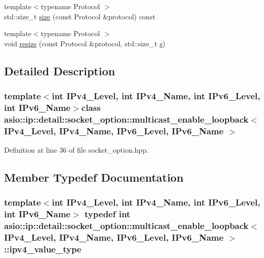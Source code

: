 \begin{DoxyCompactItemize}
\item 
{\footnotesize template$<$typename Protocol $>$ }\\std\+::size\+\_\+t \hyperlink{classasio_1_1ip_1_1detail_1_1socket__option_1_1multicast__enable__loopback_a64782a0ab8640c983d638d3ab81cc9e7}{size} (const Protocol \&protocol) const 
\item 
{\footnotesize template$<$typename Protocol $>$ }\\void \hyperlink{classasio_1_1ip_1_1detail_1_1socket__option_1_1multicast__enable__loopback_a8db9ddd26640849fd29cde0b79eda7c3}{resize} (const Protocol \&protocol, std\+::size\+\_\+t \hyperlink{group__async__connect_ga31ab74b9ea6c77932dddd016cfc7920a}{s})
\end{DoxyCompactItemize}


\subsection{Detailed Description}
\subsubsection*{template$<$int I\+Pv4\+\_\+\+Level, int I\+Pv4\+\_\+\+Name, int I\+Pv6\+\_\+\+Level, int I\+Pv6\+\_\+\+Name$>$class asio\+::ip\+::detail\+::socket\+\_\+option\+::multicast\+\_\+enable\+\_\+loopback$<$ I\+Pv4\+\_\+\+Level, I\+Pv4\+\_\+\+Name, I\+Pv6\+\_\+\+Level, I\+Pv6\+\_\+\+Name $>$}



Definition at line 36 of file socket\+\_\+option.\+hpp.



\subsection{Member Typedef Documentation}
\hypertarget{classasio_1_1ip_1_1detail_1_1socket__option_1_1multicast__enable__loopback_a3b6d854affad183c85edee00aec57436}{}
\subsubsection[{ipv4\+\_\+value\+\_\+type}]{\setlength{\rightskip}{0pt plus 5cm}template$<$int I\+Pv4\+\_\+\+Level, int I\+Pv4\+\_\+\+Name, int I\+Pv6\+\_\+\+Level, int I\+Pv6\+\_\+\+Name$>$ typedef int {\bf asio\+::ip\+::detail\+::socket\+\_\+option\+::multicast\+\_\+enable\+\_\+loopback}$<$ I\+Pv4\+\_\+\+Level, I\+Pv4\+\_\+\+Name, I\+Pv6\+\_\+\+Level, I\+Pv6\+\_\+\+Name $>$\+::{\bf ipv4\+\_\+value\+\_\+type}}\label{classasio_1_1ip_1_1detail_1_1socket__option_1_1multicast__enable__loopback_a3b6d854affad183c85edee00aec57436}


